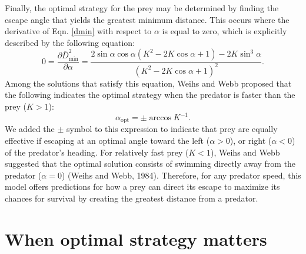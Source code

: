 \documentclass[12pt]{article}
\def\d{\partial}
\newcommand{\ol}{\overline}
\begin{document}
Finally, the optimal strategy for the prey may be determined by finding the escape angle that yields the greatest minimum distance. This occurs where the derivative of Eqn. \ref{dmin} with respect to $\alpha$ is equal to zero, which is explicitly described by the following equation:
%
\begin{equation}
0 = \frac{\d \ol{D}^2_{\text{min}}}{\d \alpha} = \frac{2\sin\alpha \cos\alpha (K^2 -2 K \cos\alpha+1)-2 K \sin^3\alpha}{(K^2-2 K \cos\alpha + 1)^2}. 
\label{eq37weihs}
\end{equation}
%
Among the solutions that satisfy this equation, Weihs and Webb proposed that the following indicates the optimal strategy when the predator is faster than the prey ($K>1$):
%
\begin{equation}
\alpha_{\text{opt}} = \pm \arccos K^{-1}. 
\label{K>1}
\end{equation}
%
We added the $\pm$ symbol to this expression to indicate that prey are equally effective if escaping at an optimal angle toward the left ($\alpha>0$), or right ($\alpha<0$) of the predator's heading. 
For relatively fast prey ($K<1$), Weihs and Webb suggested that the optimal solution consists of swimming directly away from the predator ($\alpha = 0$)  (Weihs and Webb, 1984). Therefore, for any predator speed, this model offers predictions for how a prey can direct its escape to maximize its chances for survival by creating the greatest distance from a predator. 

\section{When optimal strategy matters}
\end{document}

